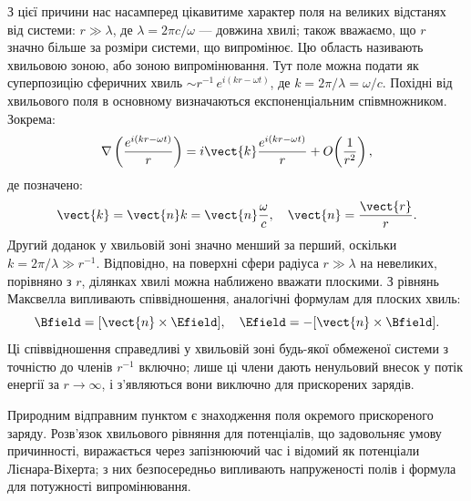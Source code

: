 З цієї причини нас насамперед цікавитиме характер поля на великих відстанях від системи: $r \gg \lambda$, де $\lambda =
{2\pi c}/{\omega}$ --- довжина хвилі; також вважаємо, що $r$ значно більше за розміри системи, що випромінює. Цю
область називають хвильовою зоною, або зоною випромінювання. Тут поле можна подати як суперпозицію сферичних хвиль $\sim r^{-1}\, e^{i(kr - \omega t)}$, де $k = {2\pi}/{\lambda} = {\omega}/{c}$. Похідні від хвильового поля в
основному визначаються експоненціальним співмножником. Зокрема:
\begin{equation*}
    \nabla\left( \frac{e^{i(kr - \omega t)}}{r} \right) = i\vect{k}
    \frac{e^{i(kr - \omega t)}}{r} + O\!\left(\frac{1}{r^2}\right),
\end{equation*}
де позначено:
\begin{equation*}
    \vect{k} = \vect{n}k = \vect{n}\frac{\omega}{c}, \quad \vect{n} = \frac{\vect{r}}{r}.
\end{equation*}
Другий доданок у хвильовій зоні значно менший за перший, оскільки $k = {2\pi}/{\lambda} \gg r^{-1}$.
Відповідно, на поверхні сфери радіуса $r \gg \lambda$ на невеликих, порівняно з $r$, ділянках хвилі можна наближено
вважати плоскими. З рівнянь Максвелла випливають співвідношення, аналогічні формулам для плоских хвиль:
\begin{equation}\label{eq:plane_wavesr_relations}
    \Bfield = [\vect{n} \times \Efield], \quad \Efield = -[\vect{n} \times \Bfield].
\end{equation}
Ці співвідношення справедливі у хвильовій зоні будь-якої обмеженої системи з точністю до членів $r^{-1}$ включно;
лише ці члени дають ненульовий внесок у потік енергії за $r \to \infty$, і з'являються вони виключно для прискорених
зарядів.

Природним відправним пунктом є знаходження поля окремого прискореного заряду. Розв'язок хвильового рівняння для
потенціалів, що задовольняє умову причинності, виражається через запізнюючий час і відомий як потенціали
Лієнара-Віхерта; з них безпосередньо випливають напруженості полів і формула для потужності випромінювання.

